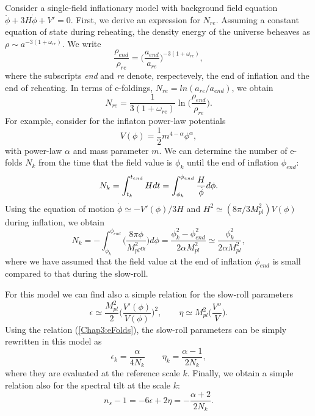 \documentclass[11pt,a4paper,twoside]{book}
\begin{document}
 Consider a single-field inflationary model with background field equation $ \ddot{\phi}+3H\dot{\phi} + V'=0 $. First, we derive an expression for $ N_{re} $. Assuming a constant equation of state during reheating,  the density energy of the universe beheaves as $ \rho \sim a^{-3(1+\omega_{re})} $. We write
\begin{equation}
	\label{Chap3:DensityEnergyBeheaviour}
	\frac{\rho_{end}}{\rho_{re}}=\Bigg( \frac{a_{end}}{a_{re}}\Bigg)^{-3(1+\omega_{re})},
\end{equation}
where the subscripts \textit{end} and \textit{re} denote, respectevely, the end of inflation and the end of reheating. In terms of e-foldings, $ N_{re}=ln(a_{re}/a_{end}) $, we obtain
\begin{equation}
	\label{Chap3:Nre}
	N_{re}=\frac{1}{3(1+\omega_{re})}\ln\Bigg(\frac{\rho_{end}}{\rho_{re}}\Bigg).
\end{equation}
For example,  consider for the inflaton power-law potentials
\begin{equation}
	\label{Chap3:potentialInflation}
	V(\phi)=\frac{1}{2}m^{4-\alpha}\phi^{\alpha},
\end{equation}
with power-law $\alpha$ and mass parameter $ m $. We can determine the number of e-folds $ N_{k} $ from the time that the field value is $\phi_{k}$ until the end of inflation $ \phi_{end} $: 
\begin{equation}
	\label{Chap3:N_{k}}
	N_{k}=\int_{t_{k}}^{t_{end}} H dt = \int_{\phi_{k}}^{\phi_{end}}\frac{H}{\dot{\phi}}d\phi.
\end{equation}
Using the equation of motion  $\dot{\phi} \simeq -V'(\phi)/3H $ and $ H^{2}\simeq (8\pi /3M_{pl}^{2})V(\phi) $ during inflation, we obtain
\begin{equation}
	\label{Chap3:eFolds}
	N_{k}=-\int_{\phi_{k}}^{\phi_{end}}\Bigg(\frac{8\pi \phi}{M_{pl}^{2}\alpha}\Bigg)d\phi = \frac{\phi^{2}_{k} - \phi^{2}_{end}}{2\alpha M_{pl}^{2}} \simeq \frac{\phi_{k}^{2}}{2\alpha M_{pl}^{2}},
\end{equation}
where we have assumed that the field value at the end of inflation $\phi_{end}$ is small compared to that during the slow-roll. 

For this model we can find also a simple relation for the slow-roll parameters
\begin{equation}
	\label{Chap3:slowRollParameters}
	\epsilon \simeq \frac{M_{pl}^{2}}{2}\Bigg(\frac{V'(\phi)}{V(\phi)}\Bigg)^{2},
	\qquad
	\eta \simeq M_{pl}^{2}\Bigg(\frac{V''}{V}\Bigg).
\end{equation}
Using the relation (\ref{Chap3:eFolds}), the slow-roll parameters can be simply rewritten in this model as
\begin{equation}
	\label{Chap3:slowRollParameters2}
	\epsilon_{k} = \frac{\alpha}{4N_{k}}
	\qquad
	\eta_{k}=\frac{\alpha-1}{2N_{k}},
\end{equation}
where they are evaluated at the reference scale $ k $. Finally, we obtain a simple relation also for the spectral tilt at the scale $ k $:
\begin{equation}
	\label{Chap3:spectralTilt}
	n_{s}-1=-6\epsilon + 2\eta = -\frac{\alpha + 2}{2N_{k}}.
\end{equation}
\end{document}

